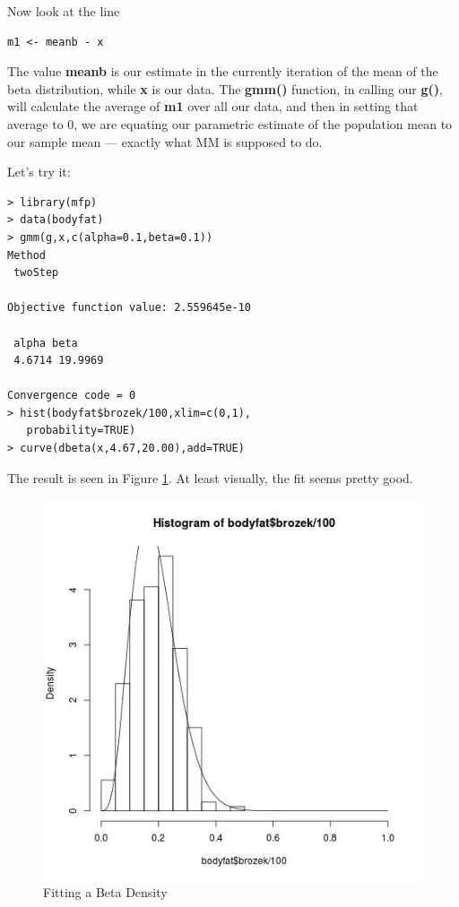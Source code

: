 Now look at the line

\begin{lstlisting}
m1 <- meanb - x
\end{lstlisting}

The value {\bf meanb} is our estimate in the currently iteration of the
mean of the beta distribution, while {\bf x} is our data.  The {\bf
gmm()} function, in calling our {\bf g()}, will calculate the average of
{\bf m1} over all our data, and then in setting that average to 0, we
are equating our parametric estimate of the population mean to our
sample mean --- exactly what MM is supposed to do.

Let's try it:

\begin{lstlisting}
> library(mfp)
> data(bodyfat)
> gmm(g,x,c(alpha=0.1,beta=0.1))
Method
 twoStep 

Objective function value: 2.559645e-10 

 alpha beta 
 4.6714 19.9969 

Convergence code = 0 
> hist(bodyfat$brozek/100,xlim=c(0,1),
   probability=TRUE)
> curve(dbeta(x,4.67,20.00),add=TRUE)
\end{lstlisting} 

The result is seen in Figure \ref{betafit}.  At least visually, the
fit seems pretty good.

\begin{figure}
\centerline{
\includegraphics[width=5.0in]{Bodyfat.jpg}
}
\caption{Fitting a Beta Density}
\label{betafit}
\end{figure}



